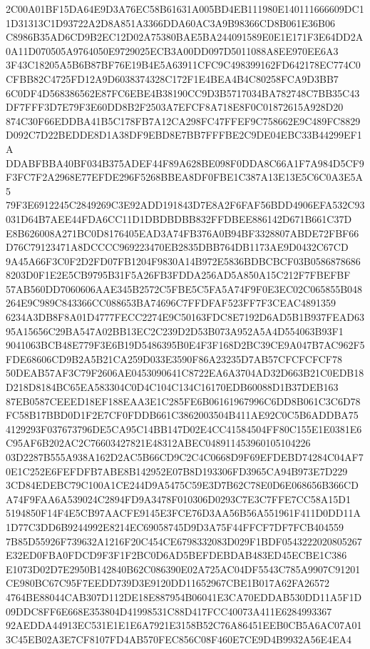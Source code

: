 \documentclass[UTF8,fontset=fandol,zihao=-4,a4paper]{ctexart}
\begin{document}
{{2C00A01BF15DA64E9D3A76EC58B61631A005BD4EB111980E140111666609DC11D31313C1D93722A2D8A851A3366DDA60AC3A9B98366CD8B061E36B06
C8986B35AD6CD9B2EC12D02A75380BAE5BA244091589E0E1E171F3E64DD2A0A11D070505A9764050E9729025ECB3A00DD097D5011088A8EE970EE6A3
3F43C18205A5B6B87BF76E19B4E5A63911CFC9C498399162FD642178EC774C0CFBB82C4725FD12A9D6038374328C172F1E4BEA4B4C80258FCA9D3BB7
6C0DF4D568386562E87FC6EBE4B38190CC9D3B5717034BA782748C7BB35C43DF7FFF3D7E79F3E60DD8B2F2503A7EFCF8A718E8F0C01872615A928D20
874C30F66EDDBA41B5C178FB7A12CA298FC47FFEF9C758662E9C489FC8829D092C7D22BEDDE8D1A38DF9EBD8E7BB7FFFBE2C9DE04EBC33B44299EF1A
DDABFBBA40BF034B375ADEF44F89A628BE098F0DDA8C66A1F7A984D5CF9F3FC7F2A2968E77EFDE296F5268BBEA8DF0FBE1C387A13E13E5C6C0A3E5A5
79F3E6912245C2849269C3E92ADD191843D7E8A2F6FAF56BDD4906EFA532C93031D64B7AEE44FDA6CC11D1DBDBDBB832FFDBEE886142D671B661C37D
E8B626008A271BC0D8176405EAD3A74FB376A0B94BF3328807ABDE72FBF66D76C79123471A8DCCCC969223470EB2835DBB764DB1173AE9D0432C67CD
9A45A66F3C0F2D2FD07FB1204F9830A14B972E5836BDBCBCF03B05868786868203D0F1E2E5CB9795B31F5A26FB3FDDA256AD5A850A15C212F7FBEFBF
57AB560DD7060606AAE345B2572C5FBE5C5FA5A74F9F0E3EC02C065855B048264E9C989C843366CC088653BA74696C7FFDFAF523FF7F3CEAC4891359
6234A3DB8F8A01D4777FECC2274E9C50163FDC8E7192D6AD5B1B937FEAD6395A15656C29BA547A02BB13EC2C239D2D53B073A952A5A4D554063B93F1
9041063BCB48E779F3E6B19D5486395B0E4F3F168D2BC39CE9A047B7AC962F5FDE68606CD9B2A5B21CA259D033E3590F86A23235D7AB57CFCFCFCF78
50DEAB57AF3C79F2606AE0453090641C8722EA6A3704AD32D663B21C0EDB18D218D8184BC65EA583304C0D4C104C134C16170EDB60088D1B37DEB163
87EB0587CEEED18EF188EAA3E1C285FE6B06161967996C6DD8B061C3C6D78FC58B17BBD0D1F2E7CF0FDDB661C3862003504B411AE92C0C5B6ADDBA75
4129293F037673796DE5CA95C14BB147D02E4CC41584504FF80C155E1E0381E6C95AF6B202AC2C76603427821E48312ABEC048911453960105104226
03D2287B555A938A162D2AC5B66CD9C2C4C0668D9F69EFDEBD74284C04AF70E1C252E6FEFDFB7ABE8B142952E07B8D193306FD3965CA94B973E7D229
3CD84EDEBC79C100A1CE244D9A5475C59E3D7B62C78E0D6E068656B366CDA74F9FAA6A539024C2894FD9A3478F010306D0293C7E3C7FFE7CC58A15D1
5194850F14F4E5CB97AACFE9145E3FCE76D3AA56B56A551961F411D0DD11A1D77C3DD6B9244992E8214EC69058745D9D3A75F44FFCF7DF7FCB404559
7B85D55926F739632A1216F20C454CE6798332083D029F1BDF0543222020805267E32ED0FBA0FDCD9F3F1F2BC0D6AD5BEFDEBDAB483ED45ECBE1C386
E1073D02D7E2950B142840B62C086390E02A725AC04DF5543C785A9907C91201CE980BC67C95F7EEDD739D3E9120DD11652967CBE1B017A62FA26572
4764BE88044CAB307D112DE18E887954B06041E3CA70EDDAB530DD11A5F1D09DDC8FF6E668E353804D41998531C88D417FCC40073A411E6284993367
92AEDDA44913EC531E1E1E6A7921E3158B52C76A86451EEB0CB5A6AC07A013C45EB02A3E7CF8107FD4AB570FEC856C08F460E7CE9D4B9932A56E4EA4
}}
\end{document}
